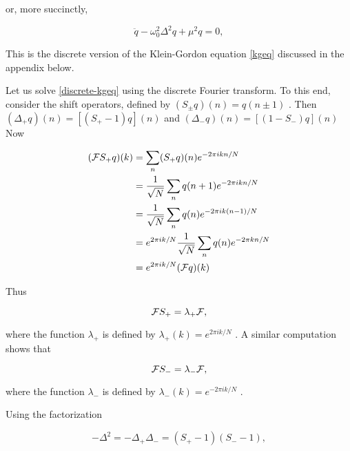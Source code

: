 or,  more  succinctly,



\begin{equation}
\label{discrete-kgeq}
\ddot q - \omega_0^2 \Delta^2 q + \mu^2 q = 0,
\end{equation}


This
 is  the  discrete  version  of  the  Klein-Gordon  equation   \eqref{kgeq} discussed  in  the  appendix  below.



Let  us  solve   \eqref{discrete-kgeq} using  the  discrete  Fourier  transform.   To  this  end,  consider  the  shift  operators,  defined  by   $(S_{\pm}q)(n) = q(n\pm 1)$ .   Then   $(\Delta_+ q)(n)= [(S_+ - 1 )q](n)$  and    $(\Delta_- q)(n)= [(1 - S_-)q](n)$  Now



\begin{align}
(\mathcal{F} S_+q)(k) &= \sum_n  ( S_+ q )(n) e^{-2\pi i kn/N} \\
&= \frac{1}{\sqrt N} \sum_n q(n+1) e^{-2\pi i kn/N} \\
&= \frac{1}{\sqrt N} \sum_n q(n) e^{-2\pi i k(n-1)/N} \\
&= e^{2\pi i k/N} \frac{1}{\sqrt N}  \sum_n q(n) e^{-2\pi kn/N } \\
&=  e^{2\pi i k/N} (\mathcal{F} q)(k)
\end{align}


Thus



\begin{equation}
\mathcal{F} S_+ = \lambda_+\mathcal{F},
\end{equation}


where   the  function   $\lambda_+$  is  defined  by   $\lambda_+(k) =  e^{ 2\pi ik/N}$ .   A  similar  computation  shows  that



\begin{equation}
\mathcal{F} S_- = \lambda_-\mathcal{F},
\end{equation}


where   the  function   $\lambda_-$  is  defined  by   $\lambda_-(k) =  e^{- 2\pi ik/N}$ .



Using  the  factorization



\begin{equation}
-\Delta^2 = - \Delta_+\Delta_- =  (S_+ - 1)(S_-  -  1),
\end{equation}


